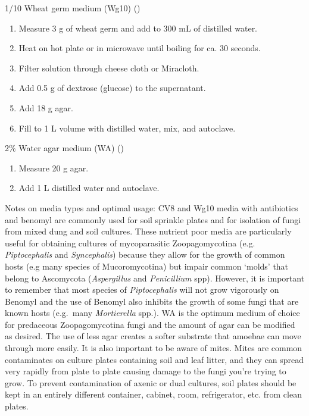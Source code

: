 \documentclass[]{book}
\providecommand{\tightlist}{%
  \setlength{\itemsep}{0pt}\setlength{\parskip}{0pt}}
\begin{document}
{1/10 Wheat germ medium} (Wg10) (\citet{Benny_2016})

\begin{enumerate}
\def\labelenumi{\arabic{enumi}.}
\tightlist
\item
  Measure 3 g of wheat germ and add to 300 mL of distilled water.
\item
  Heat on hot plate or in microwave until boiling for ca. 30 seconds.
\item
  Filter solution through cheese cloth or Miracloth.
\item
  Add 0.5 g of dextrose (glucose) to the supernatant.
\item
  Add 18 g agar.
\item
  Fill to 1 L volume with distilled water, mix, and autoclave.
\end{enumerate}

{2\% Water agar medium} (WA) (\citet{Lichtwardt_1986})

\begin{enumerate}
\def\labelenumi{\arabic{enumi}.}
\tightlist
\item
  Measure 20 g agar.
\item
  Add 1 L distilled water and autoclave.
\end{enumerate}

Notes on media types and optimal usage: CV8 and Wg10 media with
antibiotics and benomyl are commonly used for soil sprinkle plates and
for isolation of fungi from mixed dung and soil cultures. These nutrient
poor media are particularly useful for obtaining cultures of
mycoparasitic Zoopagomycotina (e.g. \emph{Piptocephalis} and
\emph{Syncephalis}) because they allow for the growth of common hosts
(e.g many species of Mucoromycotina) but impair common `molds' that
belong to Ascomycota (\emph{Aspergillus} and \emph{Penicillium} spp).
However, it is important to remember that most species of
\emph{Piptocephalis} will not grow vigorously on Benomyl and the use of
Benomyl also inhibits the growth of some fungi that are known hosts
(e.g.~many \emph{Mortierella} spp.). WA is the optimum medium of choice
for predaceous Zoopagomycotina fungi and the amount of agar can be
modified as desired. The use of less agar creates a softer substrate
that amoebae can move through more easily. It is also important to be
aware of mites. Mites are common contaminates on culture plates
containing soil and leaf litter, and they can spread very rapidly from
plate to plate causing damage to the fungi you're trying to grow. To
prevent contamination of axenic or dual cultures, soil plates should be
kept in an entirely different container, cabinet, room, refrigerator,
etc. from clean plates.
\end{document}

